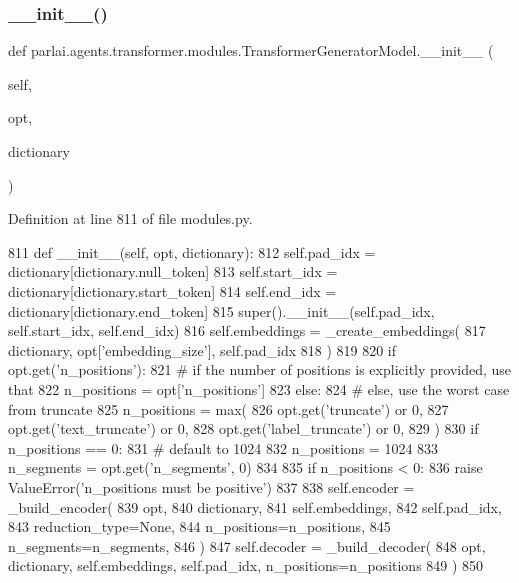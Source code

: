 \subsubsection{\texorpdfstring{\+\_\+\+\_\+init\+\_\+\+\_\+()}{\_\_init\_\_()}}
{\footnotesize\ttfamily def parlai.\+agents.\+transformer.\+modules.\+Transformer\+Generator\+Model.\+\_\+\+\_\+init\+\_\+\+\_\+ (\begin{DoxyParamCaption}\item[{}]{self,  }\item[{}]{opt,  }\item[{}]{dictionary }\end{DoxyParamCaption})}



Definition at line 811 of file modules.\+py.


\begin{DoxyCode}
811     \textcolor{keyword}{def }\_\_init\_\_(self, opt, dictionary):
812         self.pad\_idx = dictionary[dictionary.null\_token]
813         self.start\_idx = dictionary[dictionary.start\_token]
814         self.end\_idx = dictionary[dictionary.end\_token]
815         super().\_\_init\_\_(self.pad\_idx, self.start\_idx, self.end\_idx)
816         self.embeddings = \_create\_embeddings(
817             dictionary, opt[\textcolor{stringliteral}{'embedding\_size'}], self.pad\_idx
818         )
819 
820         \textcolor{keywordflow}{if} opt.get(\textcolor{stringliteral}{'n\_positions'}):
821             \textcolor{comment}{# if the number of positions is explicitly provided, use that}
822             n\_positions = opt[\textcolor{stringliteral}{'n\_positions'}]
823         \textcolor{keywordflow}{else}:
824             \textcolor{comment}{# else, use the worst case from truncate}
825             n\_positions = max(
826                 opt.get(\textcolor{stringliteral}{'truncate'}) \textcolor{keywordflow}{or} 0,
827                 opt.get(\textcolor{stringliteral}{'text\_truncate'}) \textcolor{keywordflow}{or} 0,
828                 opt.get(\textcolor{stringliteral}{'label\_truncate'}) \textcolor{keywordflow}{or} 0,
829             )
830             \textcolor{keywordflow}{if} n\_positions == 0:
831                 \textcolor{comment}{# default to 1024}
832                 n\_positions = 1024
833         n\_segments = opt.get(\textcolor{stringliteral}{'n\_segments'}, 0)
834 
835         \textcolor{keywordflow}{if} n\_positions < 0:
836             \textcolor{keywordflow}{raise} ValueError(\textcolor{stringliteral}{'n\_positions must be positive'})
837 
838         self.encoder = \_build\_encoder(
839             opt,
840             dictionary,
841             self.embeddings,
842             self.pad\_idx,
843             reduction\_type=\textcolor{keywordtype}{None},
844             n\_positions=n\_positions,
845             n\_segments=n\_segments,
846         )
847         self.decoder = \_build\_decoder(
848             opt, dictionary, self.embeddings, self.pad\_idx, n\_positions=n\_positions
849         )
850 
\end{DoxyCode}


